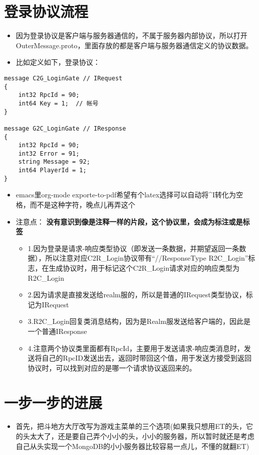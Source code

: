 \documentclass[9pt, b5paper]{article}
\begin{document}
\section{登录协议流程}
\label{sec-3}
\begin{itemize}
\item 因为登录协议是客户端与服务器通信的，不属于服务器内部协议，所以打开OuterMessage.proto，里面存放的都是客户端与服务器通信定义的协议数据。
\item 比如定义如下，登录协议：
\end{itemize}
\begin{verbatim}
message C2G_LoginGate // IRequest
{
	int32 RpcId = 90;
	int64 Key = 1;	// 帐号
}

message G2C_LoginGate // IResponse
{
	int32 RpcId = 90;
	int32 Error = 91;
	string Message = 92;
	int64 PlayerId = 1;
}
\end{verbatim}
\begin{itemize}
\item emacs里org-mode exporte-to-pdf希望有个latex选择可以自动将\^{}I转化为空格，而不是这种字符，晚点儿再弄这个
\item 注意点： \textbf{没有意识到像是注释一样的片段，这个协议里，会成为标注或是标签}
\begin{itemize}
\item 1.因为登录是请求-响应类型协议（即发送一条数据，并期望返回一条数据），所以注意对应C2R\_Login协议带有“//ResponseType R2C\_Login”标志，在生成协议时，用于标记这个C2R\_Login请求对应的响应类型为R2C\_Login
\item 2.因为请求是直接发送给realm服的，所以是普通的IRequest类型协议，标记为IRequest
\item 3.R2C\_Login回复类消息结构，因为是Realm服发送给客户端的，因此是一个普通IResponse
\item 4.注意两个协议类里面都有RpcId，主要用于发送请求-响应类消息时，发送将自己的RpcID发送出去，返回时带回这个值，用于发送方接受到返回协议时，可以找到对应的是哪一个请求协议返回来的。
\end{itemize}
\end{itemize}

\section{一步一步的进展　}
\label{sec-4}
\begin{itemize}
\item 首先，把斗地方大厅改写为游戏主菜单的三个选项(如果我只想用ET的头，它的头太大了，还是要自己弄个小小的头，小小的服务器，所以暂时就还是考虑自己从头实现一个MongoDB的小小服务器比较容易一点儿，不懂的就翻ET)
\end{itemize}
\end{document}
